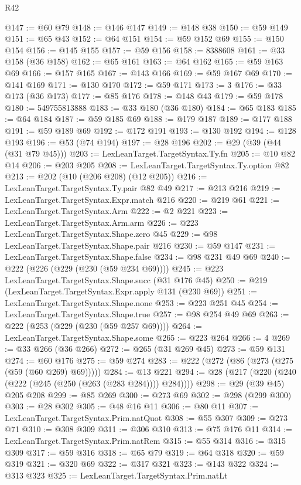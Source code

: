 \begin{lexlean}{R42}
\begin{coremodule}
@147 := @60 @79
@148 := @146 @147
@149 := @148 @38
@150 := @59 @149
@151 := @65 @43
@152 := @64 @151
@154 := @59 @152 @69
@155 := @150 @154
@156 := @145 @155
@157 := @59 @156
@158 := 8388608
@161 := @33 @158 (@36 @158)
@162 := @65 @161
@163 := @64 @162
@165 := @59 @163 @69
@166 := @157 @165
@167 := @143 @166
@169 := @59 @167 @69
@170 := @141 @169
@171 := @130 @170
@172 := @59 @171
@173 := 3
@176 := @33 @173 (@36 @173)
@177 := @85 @176
@178 := @148 @43
@179 := @59 @178
@180 := 549755813888
@183 := @33 @180 (@36 @180)
@184 := @65 @183
@185 := @64 @184
@187 := @59 @185 @69
@188 := @179 @187
@189 := @177 @188
@191 := @59 @189 @69
@192 := @172 @191
@193 := @130 @192
@194 := @128 @193
@196 := @53 (@74 @194)
@197 := @28 @196
@202 := @29 (@39 (@44 (@31 @79 @45)))
@203 := LexLeanTarget.TargetSyntax.Ty.fn
@205 := @10 @82 @14
@206 := @203 @205
@208 := LexLeanTarget.TargetSyntax.Ty.option @82
@213 := @202 (@10 (@206 @208) (@12 @205))
@216 := LexLeanTarget.TargetSyntax.Ty.pair @82 @49
@217 := @213 @216
@219 := LexLeanTarget.TargetSyntax.Expr.match @216
@220 := @219 @61
@221 := LexLeanTarget.TargetSyntax.Arm
@222 := @2 @221
@223 := LexLeanTarget.TargetSyntax.Arm.arm
@226 := @223 LexLeanTarget.TargetSyntax.Shape.zero @45
@229 := @98 LexLeanTarget.TargetSyntax.Shape.pair @216
@230 := @59 @147
@231 := LexLeanTarget.TargetSyntax.Shape.false
@234 := @98 @231 @49 @69
@240 := @222 (@226 (@229 (@230 (@59 @234 @69))))
@245 := @223 LexLeanTarget.TargetSyntax.Shape.succ (@31 @176 @45)
@250 := @219 (LexLeanTarget.TargetSyntax.Expr.apply @131 (@230 @69))
@251 := LexLeanTarget.TargetSyntax.Shape.none
@253 := @223 @251 @45
@254 := LexLeanTarget.TargetSyntax.Shape.true
@257 := @98 @254 @49 @69
@263 := @222 (@253 (@229 (@230 (@59 @257 @69))))
@264 := LexLeanTarget.TargetSyntax.Shape.some
@265 := @223 @264
@266 := 4
@269 := @33 @266 (@36 @266)
@272 := @265 (@31 @269 @45)
@273 := @59 @131
@274 := @60 @176
@275 := @59 @274
@283 := @222 (@272 (@86 (@273 (@275 (@59 (@60 @269) @69)))))
@284 := @13 @221
@294 := @28 (@217 (@220 (@240 (@222 (@245 (@250 (@263 (@283 @284)))) @284))))
@298 := @29 (@39 @45) @205 @208
@299 := @85 @269
@300 := @273 @69
@302 := @298 (@299 @300)
@303 := @28 @302
@305 := @48 @16 @11
@306 := @80 @11
@307 := LexLeanTarget.TargetSyntax.Prim.natQuot
@308 := @55 @307
@309 := @273 @71
@310 := @308 @309
@311 := @306 @310
@313 := @75 @176 @11
@314 := LexLeanTarget.TargetSyntax.Prim.natRem
@315 := @55 @314
@316 := @315 @309
@317 := @59 @316
@318 := @65 @79
@319 := @64 @318
@320 := @59 @319
@321 := @320 @69
@322 := @317 @321
@323 := @143 @322
@324 := @313 @323
@325 := LexLeanTarget.TargetSyntax.Prim.natLt

\end{coremodule}
\end{lexlean}
